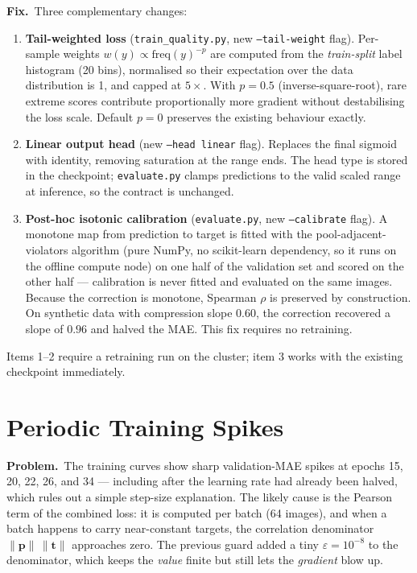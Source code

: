 \documentclass[12pt, letterpaper]{article}
\newcommand{\code}[1]{\texttt{#1}}
\newcommand{\problem}[1]{\textbf{Problem.}~#1}
\newcommand{\fix}[1]{\textbf{Fix.}~#1}
\begin{document}
\fix{Three complementary changes:
\begin{enumerate}[leftmargin=1.6em, itemsep=1pt]
  \item \textbf{Tail-weighted loss} (\code{train\_quality.py}, new \code{--tail-weight}
        flag). Per-sample weights $w(y) \propto \mathrm{freq}(y)^{-p}$ are computed from
        the \emph{train-split} label histogram (20 bins), normalised so their expectation
        over the data distribution is 1, and capped at $5\times$. With $p=0.5$
        (inverse-square-root), rare extreme scores contribute proportionally more
        gradient without destabilising the loss scale. Default $p=0$ preserves the
        existing behaviour exactly.
  \item \textbf{Linear output head} (new \code{--head linear} flag). Replaces the final
        sigmoid with identity, removing saturation at the range ends. The head type is
        stored in the checkpoint; \code{evaluate.py} clamps predictions to the valid
        scaled range at inference, so the contract is unchanged.
  \item \textbf{Post-hoc isotonic calibration} (\code{evaluate.py}, new
        \code{--calibrate} flag). A monotone map from prediction to target is fitted with
        the pool-adjacent-violators algorithm (pure NumPy, no scikit-learn dependency,
        so it runs on the offline compute node) on one half of the validation set and
        scored on the other half --- calibration is never fitted and evaluated on the
        same images. Because the correction is monotone, Spearman $\rho$ is preserved by
        construction. On synthetic data with compression slope $0.60$, the correction
        recovered a slope of $0.96$ and halved the MAE. This fix requires no retraining.
\end{enumerate}
Items 1--2 require a retraining run on the cluster; item 3 works with the existing
checkpoint immediately.}

\section{Periodic Training Spikes}

\problem{The training curves show sharp validation-MAE spikes at epochs 15, 20, 22, 26,
and 34 --- including after the learning rate had already been halved, which rules out a
simple step-size explanation. The likely cause is the Pearson term of the combined loss:
it is computed per batch (64 images), and when a batch happens to carry near-constant
targets, the correlation denominator $\|\mathbf{p}\|\,\|\mathbf{t}\|$ approaches zero.
The previous guard added a tiny $\varepsilon = 10^{-8}$ to the denominator, which keeps
the \emph{value} finite but still lets the \emph{gradient} blow up.}
\end{document}
